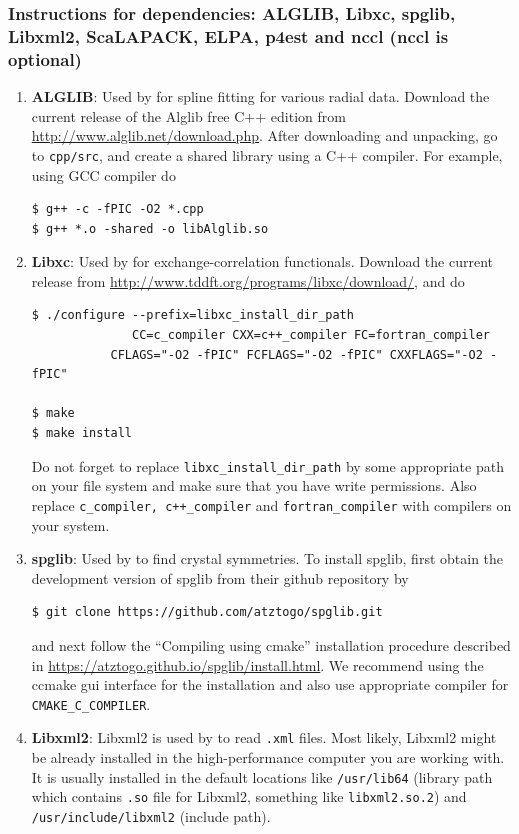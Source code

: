 \subsubsection{Instructions for dependencies: ALGLIB, Libxc, spglib, Libxml2, ScaLAPACK, ELPA, p4est and nccl (nccl is optional)}
\begin{enumerate}
	\item   {\bf ALGLIB}: Used by \dftfe{} for spline fitting for various radial data. Download the current release of the Alglib free C++ edition from \url{http://www.alglib.net/download.php}. After downloading and unpacking, go to \verb|cpp/src|, and create a shared library using a C++ compiler. For example, using GCC compiler do
\begin{verbatim}
$ g++ -c -fPIC -O2 *.cpp
$ g++ *.o -shared -o libAlglib.so
\end{verbatim}
\item {\bf Libxc}: Used by \dftfe{} for exchange-correlation functionals. Download the current release from \url{http://www.tddft.org/programs/libxc/download/}, and do 
\begin{verbatim}
$ ./configure --prefix=libxc_install_dir_path
              CC=c_compiler CXX=c++_compiler FC=fortran_compiler
	       CFLAGS="-O2 -fPIC" FCFLAGS="-O2 -fPIC" CXXFLAGS="-O2 -fPIC"
     
$ make
$ make install
\end{verbatim}
Do not forget to replace \verb|libxc_install_dir_path| by some appropriate path on your file system and make sure that you have write permissions. Also replace \verb|c_compiler, c++_compiler| and \verb|fortran_compiler| with compilers on your system.

\item {\bf spglib}: Used by \dftfe{} to find crystal symmetries. To install spglib, first obtain the development version of spglib from their github repository by
\begin{verbatim}
$ git clone https://github.com/atztogo/spglib.git	
\end{verbatim}	
and next follow the ``Compiling using cmake'' installation procedure described in \url{https://atztogo.github.io/spglib/install.html}.   	
We recommend using the ccmake gui interface for the installation and also use appropriate compiler for \verb|CMAKE_C_COMPILER|.

\item {\bf Libxml2}: Libxml2 is used by \dftfe{} to read \verb|.xml| files. Most likely, Libxml2 might be already installed in the high-performance computer you are working with. It is usually installed in the default locations like \verb|/usr/lib64| (library path which contains \verb|.so| file for Libxml2, something like \verb|libxml2.so.2|) and \verb|/usr/include/libxml2| (include path). 


\end{enumerate}
